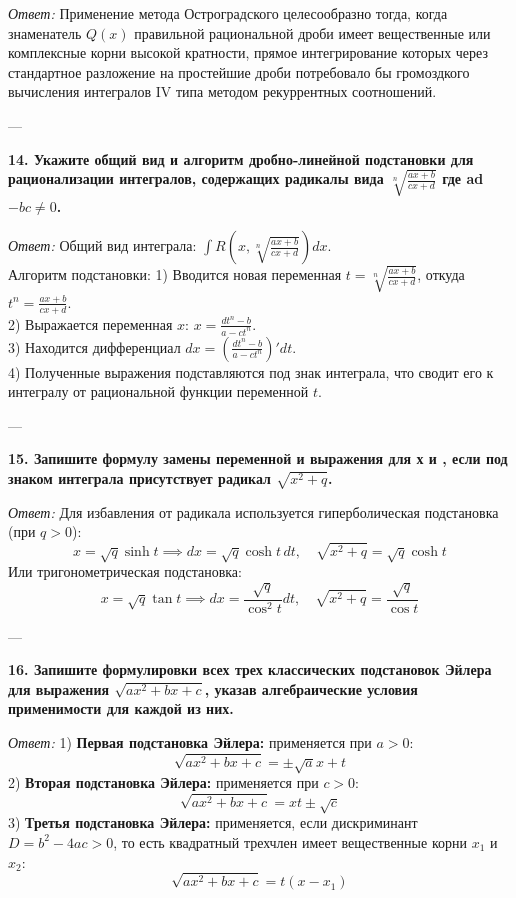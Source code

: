 \documentclass{article}
\begin{document}
\textit{Ответ:} Применение метода Остроградского целесообразно тогда, когда знаменатель $Q(x)$ правильной рациональной дроби имеет вещественные или комплексные корни высокой кратности, прямое интегрирование которых через стандартное разложение на простейшие дроби потребовало бы громоздкого вычисления интегралов IV типа методом рекуррентных соотношений.

---

\textbf{14. Укажите общий вид и алгоритм дробно-линейной подстановки для рационализации интегралов, содержащих радикалы вида $\sqrt[n]{\frac{ax+b}{cx+d}}$ где ad $-bc\ne0$.}

\textit{Ответ:} Общий вид интеграла: $\int R\left(x, \sqrt[n]{\frac{ax+b}{cx+d}}\right) dx$. \\
Алгоритм подстановки:
1) Вводится новая переменная $t = \sqrt[n]{\frac{ax+b}{cx+d}}$, откуда $t^n = \frac{ax+b}{cx+d}$. \\
2) Выражается переменная $x$: $x = \frac{dt^n - b}{a - ct^n}$. \\
3) Находится дифференциал $dx = \left(\frac{dt^n - b}{a - ct^n}\right)' dt$. \\
4) Полученные выражения подставляются под знак интеграла, что сводит его к интегралу от рациональной функции переменной $t$.

---

\textbf{15. Запишите формулу замены переменной и выражения для х и , если под знаком интеграла присутствует радикал $\sqrt{x^{2}+q}$.}

\textit{Ответ:} Для избавления от радикала используется гиперболическая подстановка (при $q > 0$):
$$ x = \sqrt{q} \sinh t \implies dx = \sqrt{q} \cosh t \, dt, \quad \sqrt{x^2+q} = \sqrt{q} \cosh t $$
Или тригонометрическая подстановка:
$$ x = \sqrt{q} \tan t \implies dx = \frac{\sqrt{q}}{\cos^2 t} dt, \quad \sqrt{x^2+q} = \frac{\sqrt{q}}{\cos t} $$

---

\textbf{16. Запишите формулировки всех трех классических подстановок Эйлера для выражения $\sqrt{ax^{2}+bx+c}$, указав алгебраические условия применимости для каждой из них.}

\textit{Ответ:}
1) \textbf{Первая подстановка Эйлера:} применяется при $a > 0$:
$$ \sqrt{ax^2+bx+c} = \pm\sqrt{a}x + t $$
2) \textbf{Вторая подстановка Эйлера:} применяется при $c > 0$:
$$ \sqrt{ax^2+bx+c} = xt \pm \sqrt{c} $$
3) \textbf{Третья подстановка Эйлера:} применяется, если дискриминант $D = b^2 - 4ac > 0$, то есть квадратный трехчлен имеет вещественные корни $x_1$ и $x_2$:
$$ \sqrt{ax^2+bx+c} = t(x - x_1) $$
\end{document}

